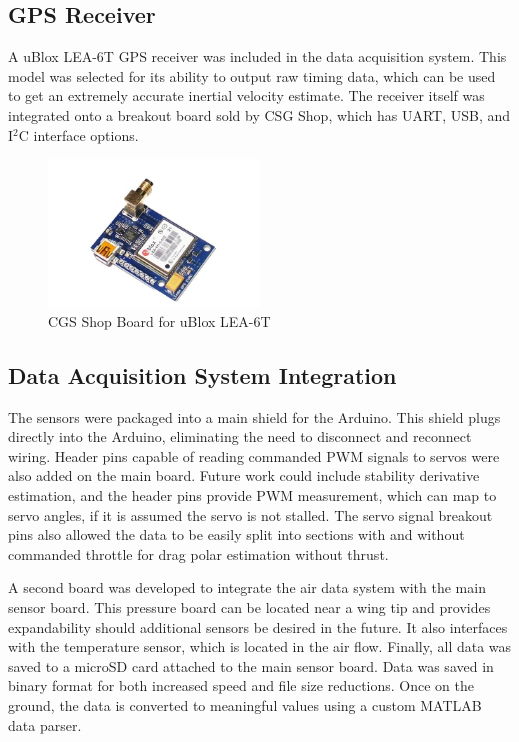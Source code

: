 \subsection*{GPS Receiver}
A uBlox LEA-6T GPS receiver was included in the data acquisition system. This model was selected for its ability to output raw timing data, which can be used to get an extremely accurate inertial velocity estimate\cite{ubloxDemo}. The receiver itself was integrated onto a breakout board sold by CSG Shop, which has UART, USB, and I$^2$C interface options. 

\begin{figure}[H]
  \centering
    \includegraphics[width=0.5\textwidth]{figures/gpsNoBack.jpg}
  \caption{CGS Shop Board for uBlox LEA-6T} \label{gpsPicture}
\end{figure}

\subsection*{Data Acquisition System Integration}
The sensors were packaged into a main shield for the Arduino. This shield plugs directly into the Arduino, eliminating the need to disconnect and reconnect wiring. Header pins capable of reading commanded PWM signals to servos were also added on the main board. Future work could include stability derivative estimation, and the header pins provide PWM measurement, which can map to servo angles, if it is assumed the servo is not stalled. The servo signal breakout pins also allowed the data to be easily split into sections with and without commanded throttle for drag polar estimation without thrust.

A second board was developed to integrate the air data system with the main sensor board. This pressure board can be located near a wing tip and provides expandability should additional sensors be desired in the future. It also interfaces with the temperature sensor, which is located in the air flow. Finally, all data was saved to a microSD card attached to the main sensor board. Data was saved in binary format for both increased speed and file size reductions. Once on the ground, the data is converted to meaningful values using a custom MATLAB data parser.
